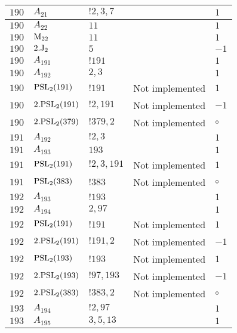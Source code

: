 \documentclass[a4paper, 11pt]{article}
\begin{document}
\begin{longtable}{lllll}
        $ 190 $ & $ A_{21} $ & $ ! 2,3,7 $ & $ ~ $ & $ 1$ \\ \hline
        $ 190 $ & $ A_{22} $ & $ 11 $ & $ ~ $ & $ 1$ \\ \hline
        $ 190 $ & $ {\rm M}_{22} $ & $ 11 $ & $ ~ $ & $ 1$ \\ \hline
        $ 190 $ & $ 2.{\rm J}_2 $ & $ 5 $ & $ ~ $ & $ -1$ \\ \hline
        $ 190 $ & $ A_{191} $ & $ !191 $ & $ ~ $ & $ 1$ \\ \hline
        $ 190 $ & $ A_{192} $ & $ 2, 3 $ & $ ~ $ & $ 1$ \\ \hline
        $ 190 $ & $ {\rm PSL}_{2}(191) $ & $ !191 $ &  Not implemented & $ 1$ \\ \hline
        $ 190 $ & $ 2.{\rm PSL}_{2}(191) $ & $ !2, 191 $ &  Not implemented & $ -1$ \\ \hline
        $ 190 $ & $ 2.{\rm PSL}_{2}(379) $ & $ !379, 2 $ &  Not implemented &  $\circ$ \\ \hline
        $ 191 $ & $ A_{192} $ & $ !2, 3 $ & $ ~ $ & $ 1$ \\ \hline
        $ 191 $ & $ A_{193} $ & $ 193 $ & $ ~ $ & $ 1$ \\ \hline
        $ 191 $ & $ {\rm PSL}_{2}(191) $ & $ !2, 3, 191 $ &  Not implemented & $ 1$ \\ \hline
        $ 191 $ & $ {\rm PSL}_{2}(383) $ & $ !383 $ &  Not implemented &  $\circ$ \\ \hline
        $ 192 $ & $ A_{193} $ & $ !193 $ & $ ~ $ & $ 1$ \\ \hline
        $ 192 $ & $ A_{194} $ & $ 2, 97 $ & $ ~ $ & $ 1$ \\ \hline
        $ 192 $ & $ {\rm PSL}_{2}(191) $ & $ !191 $ &  Not implemented & $ 1$ \\ \hline
        $ 192 $ & $ 2.{\rm PSL}_{2}(191) $ & $ !191, 2 $ &  Not implemented & $ -1$ \\ \hline
        $ 192 $ & $ {\rm PSL}_{2}(193) $ & $ !193 $ &  Not implemented & $ 1$ \\ \hline
        $ 192 $ & $ 2.{\rm PSL}_{2}(193) $ & $ !97, 193 $ &  Not implemented & $ -1$ \\ \hline
        $ 192 $ & $ 2.{\rm PSL}_{2}(383) $ & $ !383, 2 $ &  Not implemented &  $\circ$ \\ \hline
        $ 193 $ & $ A_{194} $ & $ !2, 97 $ & $ ~ $ & $ 1$ \\ \hline
        $ 193 $ & $ A_{195} $ & $ 3, 5, 13 $ & $ ~ $ & $ 1$ \\ \hline

\end{longtable}
\end{document}
